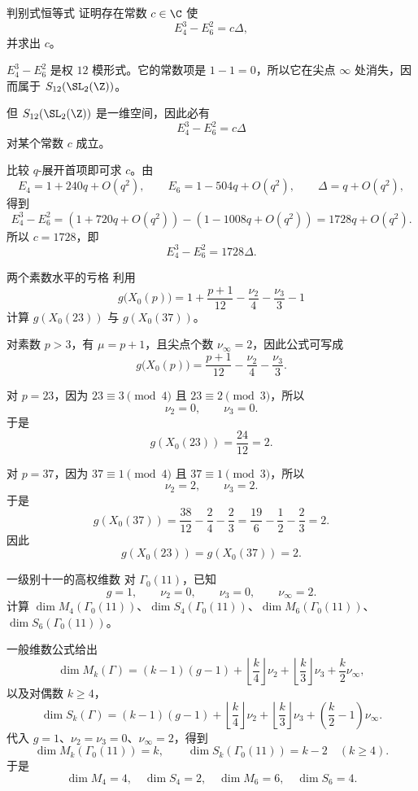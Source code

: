 \begin{problem}{判别式恒等式}
\medium
证明存在常数 $c\in\C$ 使
\[
E_4^3-E_6^2=c\Delta,
\]
并求出 $c$。
\end{problem}
\begin{solution}
$E_4^3-E_6^2$ 是权 $12$ 模形式。它的常数项是 $1-1=0$，所以它在尖点 $\infty$ 处消失，因而属于 $S_{12}(\SL_2(\Z))$。

但 $S_{12}(\SL_2(\Z))$ 是一维空间，因此必有
\[
E_4^3-E_6^2=c\Delta
\]
对某个常数 $c$ 成立。

比较 $q$-展开首项即可求 $c$。由
\[
E_4=1+240q+O(q^2),
\qquad
E_6=1-504q+O(q^2),
\qquad
\Delta=q+O(q^2),
\]
得到
\[
E_4^3-E_6^2=(1+720q+O(q^2))-(1-1008q+O(q^2))=1728q+O(q^2).
\]
所以 $c=1728$，即
\[
E_4^3-E_6^2=1728\Delta.
\]
\end{solution}

\begin{problem}{两个素数水平的亏格}
\medium
利用
\[
g\bigl(X_0(p)\bigr)=1+\frac{p+1}{12}-\frac{\nu_2}{4}-\frac{\nu_3}{3}-1
\]
计算 $g(X_0(23))$ 与 $g(X_0(37))$。
\end{problem}
\begin{solution}
对素数 $p>3$，有 $\mu=p+1$，且尖点个数 $\nu_\infty=2$，因此公式可写成
\[
g\bigl(X_0(p)\bigr)=\frac{p+1}{12}-\frac{\nu_2}{4}-\frac{\nu_3}{3}.
\]

对 $p=23$，因为 $23\equiv 3\pmod 4$ 且 $23\equiv 2\pmod 3$，所以
\[
\nu_2=0,\qquad \nu_3=0.
\]
于是
\[
g(X_0(23))=\frac{24}{12}=2.
\]

对 $p=37$，因为 $37\equiv 1\pmod 4$ 且 $37\equiv 1\pmod 3$，所以
\[
\nu_2=2,\qquad \nu_3=2.
\]
于是
\[
g(X_0(37))=\frac{38}{12}-\frac{2}{4}-\frac{2}{3}=\frac{19}{6}-\frac{1}{2}-\frac{2}{3}=2.
\]
因此
\[
g(X_0(23))=g(X_0(37))=2.
\]
\end{solution}

\begin{problem}{一级别十一的高权维数}
\medium
对 $\Gamma_0(11)$，已知
\[
g=1,\qquad \nu_2=0,\qquad \nu_3=0,\qquad \nu_\infty=2.
\]
计算 $\dim M_4(\Gamma_0(11))$、$\dim S_4(\Gamma_0(11))$、$\dim M_6(\Gamma_0(11))$、$\dim S_6(\Gamma_0(11))$。
\end{problem}
\begin{solution}
一般维数公式给出
\[
\dim M_k(\Gamma)=(k-1)(g-1)+\left\lfloor\frac{k}{4}\right\rfloor\nu_2+
\left\lfloor\frac{k}{3}\right\rfloor\nu_3+\frac{k}{2}\nu_\infty,
\]
以及对偶数 $k\ge 4$，
\[
\dim S_k(\Gamma)=(k-1)(g-1)+\left\lfloor\frac{k}{4}\right\rfloor\nu_2+
\left\lfloor\frac{k}{3}\right\rfloor\nu_3+\left(\frac{k}{2}-1\right)\nu_\infty.
\]
代入 $g=1$、$\nu_2=\nu_3=0$、$\nu_\infty=2$，得到
\[
\dim M_k(\Gamma_0(11))=k,
\qquad
\dim S_k(\Gamma_0(11))=k-2\quad (k\ge 4).
\]
于是
\[
\dim M_4=4,
\quad \dim S_4=2,
\quad \dim M_6=6,
\quad \dim S_6=4.
\]
\end{solution}

